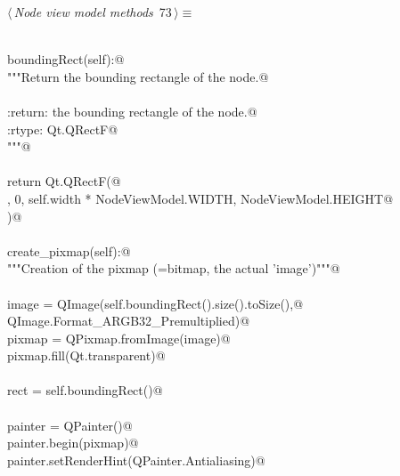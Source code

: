 \documentclass[
    a4paper,      %
    10pt,         %
    openright,    %
    notitlepage,  %
    parskip=half, %
]{scrreprt}       %
\theoremstyle{definition}                    %
\begin{document}
\begin{flushleft} \small
\begin{minipage}{\linewidth}\label{scrap126}\raggedright\small
{} $\langle\,${\itshape Node view model methods}\nobreak\ {\footnotesize {73}}$\,\rangle\equiv$
\vspace{-1ex}
\begin{list}{}{} \item
\mbox{}\lstinline@@\\
\mbox{}\lstinline@def boundingRect(self):@\\
\mbox{}\lstinline@    """Return the bounding rectangle of the node.@\\
\mbox{}\lstinline@@\\
\mbox{}\lstinline@    :return: the bounding rectangle of the node.@\\
\mbox{}\lstinline@    :rtype: Qt.QRectF@\\
\mbox{}\lstinline@    """@\\
\mbox{}\lstinline@@\\
\mbox{}\lstinline@    return Qt.QRectF(@\\
\mbox{}, 0, self.width * NodeViewModel.WIDTH, NodeViewModel.HEIGHT@\\
\mbox{}\lstinline@    )@\\
\mbox{}\lstinline@@\\
\mbox{}\lstinline@def create_pixmap(self):@\\
\mbox{}\lstinline@    """Creation of the pixmap (=bitmap, the actual 'image')"""@\\
\mbox{}\lstinline@@\\
\mbox{}\lstinline@    image = QImage(self.boundingRect().size().toSize(),@\\
\mbox{}\lstinline@                    QImage.Format_ARGB32_Premultiplied)@\\
\mbox{}\lstinline@    pixmap = QPixmap.fromImage(image)@\\
\mbox{}\lstinline@    pixmap.fill(Qt.transparent)@\\
\mbox{}\lstinline@@\\
\mbox{}\lstinline@    rect = self.boundingRect()@\\
\mbox{}\lstinline@@\\
\mbox{}\lstinline@    painter = QPainter()@\\
\mbox{}\lstinline@    painter.begin(pixmap)@\\
\mbox{}\lstinline@    painter.setRenderHint(QPainter.Antialiasing)@\\

\end{list}
\end{minipage}
\end{flushleft}
\end{document}
